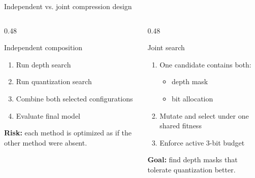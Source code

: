 \documentclass[aspectratio=169]{beamer}
\begin{document}
\begin{frame}{Independent vs. joint compression design}
\begin{columns}[T]
\begin{column}{0.48\textwidth}
\begin{block}{Independent composition}
\begin{enumerate}
    \item Run depth search
    \item Run quantization search
    \item Combine both selected configurations
    \item Evaluate final model
\end{enumerate}
\end{block}

\vspace{0.15cm}
\textbf{Risk:} each method is optimized as if the other method were absent.
\end{column}

\begin{column}{0.48\textwidth}
\begin{block}{Joint search}
\begin{enumerate}
    \item One candidate contains both:
    \begin{itemize}
        \item depth mask
        \item bit allocation
    \end{itemize}
    \item Mutate and select under one shared fitness
    \item Enforce active 3-bit budget
\end{enumerate}
\end{block}

\vspace{0.15cm}
\textbf{Goal:} find depth masks that tolerate quantization better.
\end{column}
\end{columns}
\end{frame}

\end{document}
